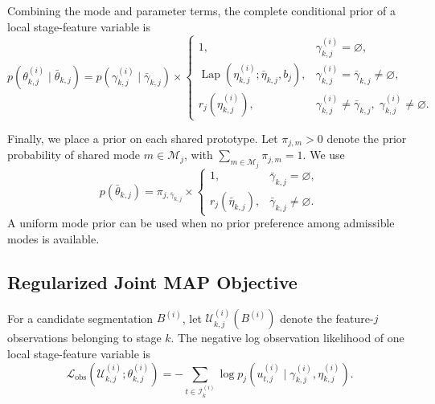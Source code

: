 \documentclass[lettersize,journal]{IEEEtran}
\begin{document}
Combining the mode and parameter terms, the complete conditional prior of a local
stage-feature variable is
\begin{equation}
p
\left(
\theta_{k,j}^{(i)}
\mid
\bar{\theta}_{k,j}
\right)
=
p
\left(
\gamma_{k,j}^{(i)}
\mid
\bar{\gamma}_{k,j}
\right)
\times
\begin{cases}
1,
& \gamma_{k,j}^{(i)}=\varnothing,
\\
\operatorname{Lap}
\left(
\eta_{k,j}^{(i)};
\bar{\eta}_{k,j},b_j
\right),
&
\gamma_{k,j}^{(i)}
=
\bar{\gamma}_{k,j}
\neq\varnothing,
\\
r_j
\left(
\eta_{k,j}^{(i)}
\right),
&
\gamma_{k,j}^{(i)}
\neq\bar{\gamma}_{k,j},
\;
\gamma_{k,j}^{(i)}
\neq\varnothing.
\end{cases}
\label{eq:complete_local_hierarchical_prior}
\end{equation}

Finally, we place a prior on each shared prototype. Let
$\pi_{j,m}>0$ denote the prior probability of shared mode $m\in\mathcal{M}_j$,
with
$\sum_{m\in\mathcal{M}_j}\pi_{j,m}=1$.
We use
\begin{equation}
p
\left(
\bar{\theta}_{k,j}
\right)
=
\pi_{j,\bar{\gamma}_{k,j}}
\times
\begin{cases}
1,
& \bar{\gamma}_{k,j}=\varnothing,
\\
r_j
\left(
\bar{\eta}_{k,j}
\right),
& \bar{\gamma}_{k,j}\neq\varnothing.
\end{cases}
\label{eq:shared_prototype_prior}
\end{equation}
A uniform mode prior can be used when no prior preference among admissible modes
is available.


\subsection{Regularized Joint MAP Objective}
\label{subsec:regularized_joint_map}

For a candidate segmentation $B^{(i)}$, let
$\mathcal{U}_{k,j}^{(i)}(B^{(i)})$ denote the feature-$j$ observations belonging
to stage $k$.
The negative log observation likelihood of one local stage-feature variable is
\begin{equation}
\mathcal{L}_{\mathrm{obs}}
\left(
\mathcal{U}_{k,j}^{(i)};
\theta_{k,j}^{(i)}
\right)
=
-
\sum_{t\in\mathcal{I}_k^{(i)}}
\log
p_j
\left(
u_{t,j}^{(i)}
\mid
\gamma_{k,j}^{(i)},
\eta_{k,j}^{(i)}
\right).
\label{eq:local_observation_nll}
\end{equation}
\end{document}
